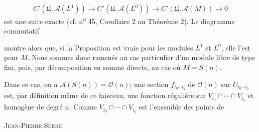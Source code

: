 \begin{equation*}
C'(\mathfrak{U}, \mathcal{A}(L^1)) \to C'(\mathfrak{U}, \mathcal{A}(L^0)) \to C'(\mathfrak{U}, \mathcal{A}(M)) \to 0
\end{equation*}
est une suite exacte (cf. n\textsuperscript{o} 45, Corollaire 2 au Théorème 2). Le diagramme commutatif

\begin{center}
\end{center}
montre alors que, si la Proposition est vraie pour les modules $L^1$ et $L^0$, elle l'est pour $M$. Nous sommes donc ramenés au cas particulier d'un module libre de type fini, puis, par décomposition en somme directe, au cas où $M = S(n)$.

Dans ce cas, on a $\mathcal{A}(S(n)) = \mathcal{O}(n)$; une section $f_{i_0 \cdots i_q}$ de $\mathcal{O}(n)$ sur $U_{i_0 \cdots i_q}$ est, par définition même de ce faisceau, une fonction régulière sur $V_{i_0} \cap \cdots \cap V_{i_q}$ et homogène de degré $n$. Comme $V_{i_0} \cap \cdots \cap V_{i_q}$ est l'ensemble des points de




\textsc{Jean-Pierre Serre}

